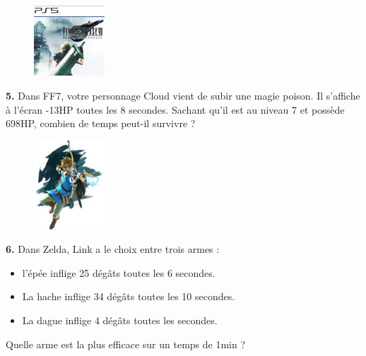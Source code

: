 \begin{minipage}[t]{0.25\textwidth}
  \begin{figure}[H]
    \centering
    \includegraphics[width=100px]{4x1-relatifs/ex2.jpg}
  \end{figure}
\end{minipage}
\begin{minipage}[t]{0.75\textwidth}
  \textbf{5.} Dans FF7, votre personnage Cloud vient de subir une magie poison. Il s'affiche à l'écran -13HP toutes les 8 secondes. Sachant qu'il est au niveau 7 et possède 698HP, combien de temps peut-il survivre ?\\
  \Pointilles[6]
\end{minipage}

\Pointilles[3]

\begin{minipage}[t]{0.25\textwidth}
  \begin{figure}[H]
    \centering
    \includegraphics[width=100px]{4x1-relatifs/ex3.jpg}
  \end{figure}
\end{minipage}
\begin{minipage}[t]{0.75\textwidth}
  \textbf{6.} Dans Zelda, Link a le choix entre trois armes : 
  \begin{itemize}
    \item l'épée inflige 25 dégâts toutes les 6 secondes.
    \item La hache inflige 34 dégâts toutes les 10 secondes.
    \item La dague inflige 4 dégâts toutes les secondes.
  \end{itemize}
  Quelle arme est la plus efficace sur un temps de 1min ?\\
  \Pointilles[5]
\end{minipage}

\Pointilles[3]

\newpage

